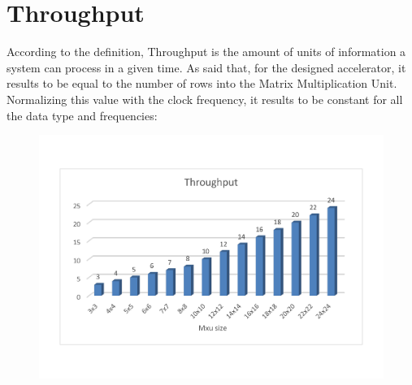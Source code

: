\newpage
\section{Throughput}
According to the definition, Throughput is the amount of units of information a system can process in a given time. As said that, for the designed accelerator, it results to be equal to the number of rows into the Matrix Multiplication Unit. Normalizing this value with the clock frequency, it results to be constant for all the data type and frequencies:
\begin{figure}[!htbp]
\centering
\captionsetup{justification=centering}
\includegraphics[scale=0.5,angle=0]{./figure/graphs/throughput.pdf}
\label{fig:tp8bit}
\end{figure}

